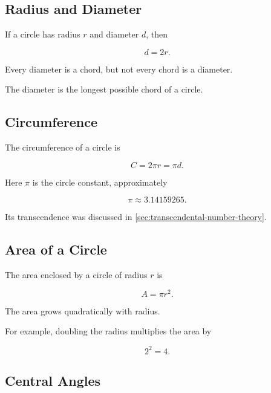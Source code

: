\subsection{Radius and Diameter}
\label{subsec:radius-diameter}

If a circle has radius \(r\) and diameter \(d\), then

\[ \boxed{d=2r.} \]

Every diameter is a chord, but not every chord is a diameter.

The diameter is the longest possible chord of a circle.

\subsection{Circumference}
\label{subsec:circumference-circle}

The circumference of a circle is

\[ \boxed{C=2\pi r=\pi d.} \]

Here \(\pi\) is the circle constant, approximately

\[ \pi\approx3.14159265. \]

Its transcendence was discussed in
\cref{sec:transcendental-number-theory}.

\subsection{Area of a Circle}
\label{subsec:circle-area}

The area enclosed by a circle of radius \(r\) is

\[ \boxed{A=\pi r^2.} \]

The area grows quadratically with radius.

For example, doubling the radius multiplies the area by

\[ 2^2=4. \]

\subsection{Central Angles}
\label{subsec:central-angles}


